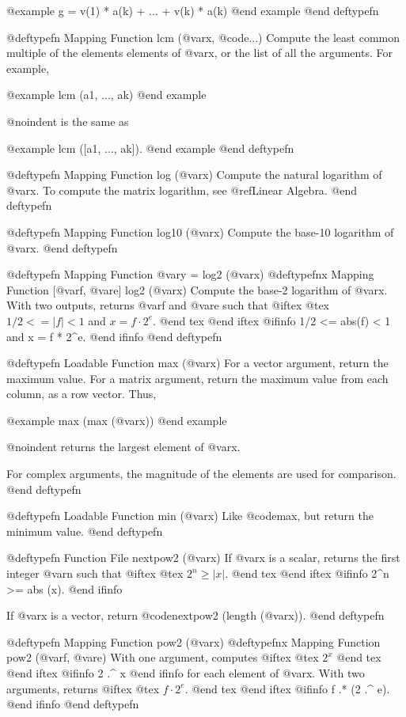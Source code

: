 @example
g = v(1) * a(k) + ... + v(k) * a(k)
@end example
@end deftypefn

@deftypefn {Mapping Function} {} lcm (@var{x}, @code{...})
Compute the least common multiple of the elements elements of @var{x}, or
the list of all the arguments.  For example, 

@example
lcm (a1, ..., ak)
@end example

@noindent
is the same as

@example
lcm ([a1, ..., ak]).
@end example
@end deftypefn

@deftypefn {Mapping Function} {} log (@var{x})
Compute the natural logarithm of @var{x}.  To compute the matrix logarithm, 
see @ref{Linear Algebra}.
@end deftypefn

@deftypefn {Mapping Function} {} log10 (@var{x})
Compute the base-10 logarithm of @var{x}.
@end deftypefn

@deftypefn {Mapping Function} {@var{y} =} log2 (@var{x})
@deftypefnx {Mapping Function} {[@var{f}, @var{e}]} log2 (@var{x})
Compute the base-2 logarithm of @var{x}.  With two outputs, returns
@var{f} and @var{e} such that
@iftex
@tex
 $1/2 <= |f| < 1$ and $x = f \cdot 2^e$.
@end tex
@end iftex
@ifinfo
 1/2 <= abs(f) < 1 and x = f * 2^e.
@end ifinfo
@end deftypefn

@deftypefn {Loadable Function} {} max (@var{x})
For a vector argument, return the maximum value.  For a matrix argument,
return the maximum value from each column, as a row vector.  Thus,

@example
max (max (@var{x}))
@end example

@noindent
returns the largest element of @var{x}.

For complex arguments, the magnitude of the elements are used for
comparison.
@end deftypefn

@deftypefn {Loadable Function} {} min (@var{x})
Like @code{max}, but return the minimum value.
@end deftypefn

@deftypefn {Function File} {} nextpow2 (@var{x})
If @var{x} is a scalar, returns the first integer @var{n} such that
@iftex
@tex
 $2^n \ge |x|$.
@end tex
@end iftex
@ifinfo
 2^n >= abs (x).
@end ifinfo

If @var{x} is a vector, return @code{nextpow2 (length (@var{x}))}.
@end deftypefn

@deftypefn {Mapping Function} {} pow2 (@var{x})
@deftypefnx {Mapping Function} {} pow2 (@var{f}, @var{e})
With one argument, computes
@iftex
@tex
 $2^x$
@end tex
@end iftex
@ifinfo
 2 .^ x
@end ifinfo
for each element of @var{x}.  With two arguments, returns
@iftex
@tex
 $f \cdot 2^e$.
@end tex
@end iftex
@ifinfo
 f .* (2 .^ e).
@end ifinfo
@end deftypefn

